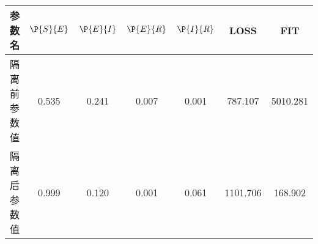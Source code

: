 \begin{tabular}{ccccccc}
\hline
参数名&$\P{S}{E}$&$\P{E}{I}$&$\P{E}{R}$&$\P{I}{R}$&LOSS&FIT\\
\hline
隔离前参数值&0.535&0.241&0.007&0.001&787.107&5010.281\\
隔离后参数值&0.999&0.120&0.001&0.061&1101.706&168.902\\
\hline
\end{tabular}